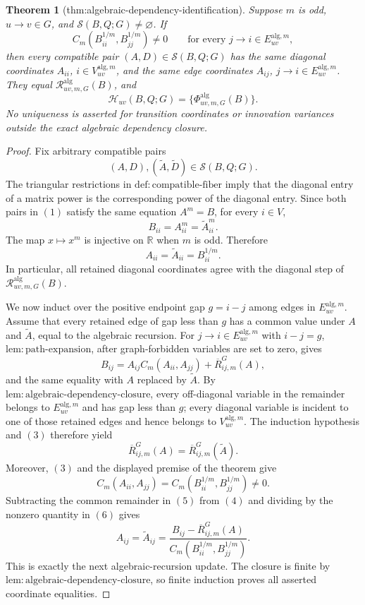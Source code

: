 \documentclass{article}
\newtheorem{theorem}{Theorem}
\begin{document}
\begin{theorem}[thm:algebraic-dependency-identification]\label{thm:algebraic-dependency-identification}
Suppose \(m\) is odd, \(u\to v\in G\), and \(\mathcal S(B,Q;G)\ne\varnothing\).  If
\[
 C_m(B_{ii}^{1/m},B_{jj}^{1/m})\ne0
 \qquad\text{for every }j\to i\in E_{uv}^{\mathrm{alg},m},
\]
then every compatible pair \((A,D)\in\mathcal S(B,Q;G)\) has the same diagonal coordinates \(A_{ii}\), \(i\in V_{uv}^{\mathrm{alg},m}\), and the same edge coordinates \(A_{ij}\), \(j\to i\in E_{uv}^{\mathrm{alg},m}\).  They equal \(\mathscr R^{\mathrm{alg}}_{uv,m,G}(B)\), and
\[
 \mathcal H_{uv}(B,Q;G)
 =\{\Phi^{\mathrm{alg}}_{uv,m,G}(B)\}.
\]
No uniqueness is asserted for transition coordinates or innovation variances outside the exact algebraic dependency closure.
\end{theorem}
\begin{proof}
Fix arbitrary compatible pairs
\[
 (A,D),(\widetilde A,\widetilde D)\in\mathcal S(B,Q;G).
\tag{1}
\]
The triangular restrictions in \(\mathrm{def{:}compatible\mbox{-}fiber}\) imply that the diagonal entry of a matrix power is the corresponding power of the diagonal entry.  Since both pairs in \((1)\) satisfy the same equation \(A^m=B\), for every \(i\in V\),
\[
 B_{ii}=A_{ii}^m=\widetilde A_{ii}^m.
\tag{2}
\]
The map \(x\mapsto x^m\) is injective on \(\mathbb R\) when \(m\) is odd.  Therefore
\[
 A_{ii}=\widetilde A_{ii}=B_{ii}^{1/m}.
\tag{3}
\]
In particular, all retained diagonal coordinates agree with the diagonal step of \(\mathscr R^{\mathrm{alg}}_{uv,m,G}(B)\).

We now induct over the positive endpoint gap \(g=i-j\) among edges in \(E_{uv}^{\mathrm{alg},m}\).  Assume that every retained edge of gap less than \(g\) has a common value under \(A\) and \(\widetilde A\), equal to the algebraic recursion.  For \(j\to i\in E_{uv}^{\mathrm{alg},m}\) with \(i-j=g\), \(\mathrm{lem{:}path\mbox{-}expansion}\), after graph-forbidden variables are set to zero, gives
\[
 B_{ij}
 =A_{ij}C_m(A_{ii},A_{jj})+\overline R^{G}_{ij,m}(A),
\tag{4}
\]
and the same equality with \(A\) replaced by \(\widetilde A\).  By \(\mathrm{lem{:}algebraic\mbox{-}dependency\mbox{-}closure}\), every off-diagonal variable in the remainder belongs to \(E_{uv}^{\mathrm{alg},m}\) and has gap less than \(g\); every diagonal variable is incident to one of those retained edges and hence belongs to \(V_{uv}^{\mathrm{alg},m}\).  The induction hypothesis and \((3)\) therefore yield
\[
 \overline R^{G}_{ij,m}(A)
 =\overline R^{G}_{ij,m}(\widetilde A).
\tag{5}
\]
Moreover, \((3)\) and the displayed premise of the theorem give
\[
 C_m(A_{ii},A_{jj})
 =C_m(B_{ii}^{1/m},B_{jj}^{1/m})\ne0.
\tag{6}
\]
Subtracting the common remainder in \((5)\) from \((4)\) and dividing by the nonzero quantity in \((6)\) gives
\[
 A_{ij}=\widetilde A_{ij}
 =\frac{B_{ij}-\overline R^{G}_{ij,m}(A)}
 {C_m(B_{ii}^{1/m},B_{jj}^{1/m})}.
\tag{7}
\]
This is exactly the next algebraic-recursion update.  The closure is finite by \(\mathrm{lem{:}algebraic\mbox{-}dependency\mbox{-}closure}\), so finite induction proves all asserted coordinate equalities.


\end{proof}
\end{document}
